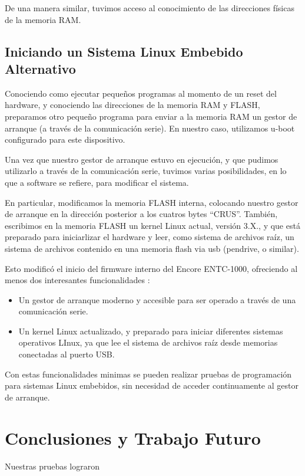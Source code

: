 \documentclass[conference]{IEEEtran}
\begin{document}
De una manera similar, tuvimos acceso al conocimiento de
las direcciones físicas de la memoria RAM.

\subsection{Iniciando un Sistema Linux Embebido Alternativo}

Conociendo como ejecutar pequeños programas al momento de un reset
del hardware, y conociendo las direcciones de la memoria RAM y FLASH,
preparamos otro pequeño programa para enviar a la memoria RAM un gestor
de arranque (a través de la comunicación serie). En nuestro caso, utilizamos
u-boot configurado para este dispositivo.

Una vez que nuestro gestor de arranque estuvo en ejecución, y
que pudimos utilizarlo a través de la comunicación serie, tuvimos
varias posibilidades, en lo que a software se refiere, para modificar
el sistema.

En particular, modificamos la memoria FLASH interna, colocando nuestro
gestor de arranque en la dirección posterior a los cuatros bytes ``CRUS''.
También, escribimos en la memoria FLASH un kernel Linux actual, versión 3.X.,
y que está preparado para iniciarlizar el hardware y leer, como sistema
de archivos raíz, un sistema de archivos contenido en una memoria flash
via usb (pendrive, o similar).

Esto modificó el inicio del firmware interno del Encore ENTC-1000, 
ofreciendo al menos dos interesantes funcionalidades :
\begin{itemize}
\item Un gestor de arranque moderno y accesible para ser operado a través de una comunicación serie.
\item Un kernel Linux actualizado, y preparado para iniciar diferentes
sistemas operativos LInux, ya que lee el sistema de archivos raíz desde 
memorias conectadas al puerto USB. 
\end{itemize}

Con estas funcionalidades minimas se pueden realizar pruebas
de programación para sistemas Linux embebidos, sin necesidad
de acceder continuamente al gestor de arranque.

\section{Conclusiones y Trabajo Futuro}



Nuestras pruebas lograron
\end{document}
